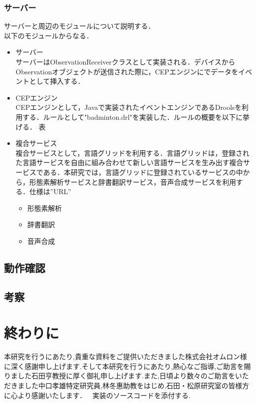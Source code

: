 \documentclass{kuisthesis}			%
\begin{document}
\subsubsection{サーバー}
サーバーと周辺のモジュールについて説明する．\\
以下のモジュールからなる．\\
\begin{itemize}
\item サーバー\\
サーバーはObservationReceiverクラスとして実装される．デバイスからObservationオブジェクトが送信された際に，CEPエンジンにでデータをイベントとして挿入する．
\item CEPエンジン\\
CEPエンジンとして，Javaで実装されたイベントエンジンであるDroolsを利用する．ルールとして"badminton.drl"を実装した．ルールの概要を以下に挙げる．
表
\item 複合サービス\\
複合サービスとして，言語グリッドを利用する．言語グリッドは，登録された言語サービスを自由に組み合わせて新しい言語サービスを生み出す複合サービスである．本研究では，言語グリッドに登録されているサービスの中から，形態素解析サービスと辞書翻訳サービス，音声合成サービスを利用する．仕様は”URL”
\begin{itemize}
\item 形態素解析
\item 辞書翻訳
\item 音声合成
\end{itemize}
\end{itemize}


\subsection{動作確認}
\subsection{考察}





\section{終わりに}

\acknowledgments				%
本研究を行うにあたり,貴重な資料をご提供いただきました株式会社オムロン様に深く感謝申し上げます.そして本研究を行うにあたり,熱心なご指導,ご助言を賜りました石田亨教授に厚く御礼申し上げます.また,日頃より数々のご助言をいただきました中口孝雄特定研究員,林冬惠助教をはじめ,石田・松原研究室の皆様方に心より感謝いたします．

\nocite{*}

\Appendix[付録]
実装のソースコードを添付する.
\end{document}
